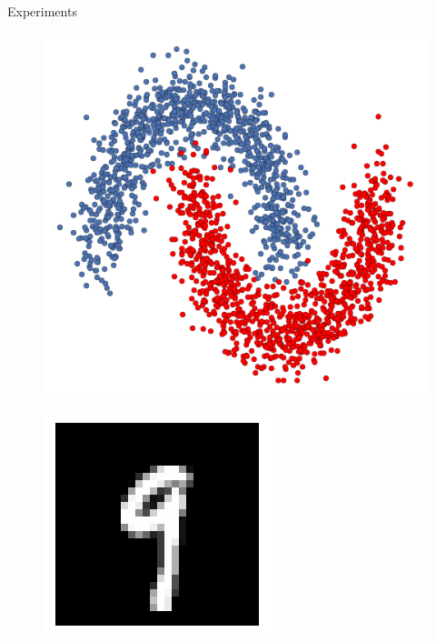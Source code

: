 \documentclass{beamer}
\begin{document}
\begin{frame}{Experiments}
\begin{minipage}[t]{0.31\columnwidth}
\begin{figure}
			\includegraphics[width=1\columnwidth]{pres_pics/moons_ex}
		\end{figure}
	\end{minipage}
	\begin{minipage}[t]{0.31\columnwidth}
		\begin{figure}
			\includegraphics[width=1\columnwidth]{pres_pics/mnist_ex}
		\end{figure}
	\end{minipage}
\end{frame}
\end{document}
